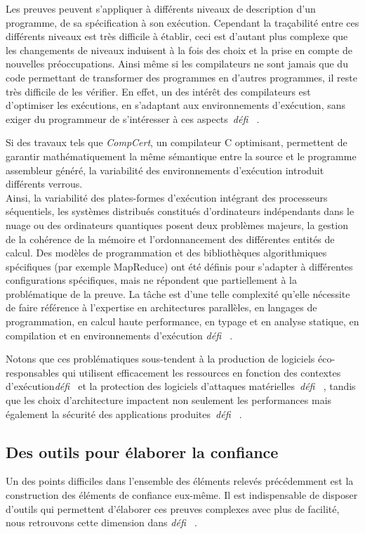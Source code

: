\documentclass[11pt]{article}
\newcommand{\defi}[1]{\emph{défi~%
\cite{#1}}}
\begin{document}
Les preuves peuvent s'appliquer à différents niveaux de description d'un programme, de sa spécification à son exécution. Cependant la traçabilité entre ces différents niveaux est très difficile à établir, ceci est d'autant plus complexe que les changements de niveaux induisent à la fois des choix et la prise en compte de nouvelles préoccupations.
Ainsi même si les compilateurs ne sont jamais que du code permettant de transformer des programmes en d'autres programmes, il reste très difficile de les vérifier. En effet, un des intérêt des compilateurs est d'optimiser les exécutions, en s'adaptant aux environnements d'exécution, sans exiger du programmeur de s'intéresser à ces aspects~\defi{Monniaux}.

Si des travaux tels que \textit{CompCert}, un compilateur C optimisant, permettent de garantir mathématiquement la même sémantique entre la source et le programme assembleur généré, la variabilité des environnements d'exécution introduit différents verrous. \\
Ainsi, la variabilité des  plates-formes d'exécution intégrant des processeurs séquentiels, les systèmes distribués constitués d'ordinateurs indépendants dans le nuage ou des ordinateurs quantiques posent  deux problèmes majeurs, la gestion de la cohérence de la mémoire et l'ordonnancement des différentes entités de calcul. Des modèles de programmation et des bibliothèques algorithmiques spécifiques (par exemple MapReduce) ont été définis pour s'adapter à différentes configurations spécifiques, mais ne répondent que partiellement à la problématique de la preuve. La tâche est d'une telle complexité qu'elle nécessite de faire référence à l'expertise en architectures parallèles, en langages de programmation, en calcul haute performance, en typage et en analyse statique, en compilation et en environnements d'exécution \defi{compilation}.

Notons que ces problématiques sous-tendent à la production de logiciels éco-responsables qui utilisent efficacement les ressources en fonction des contextes d'exécution\defi{vert} et la protection des logiciels d'attaques matérielles~\defi{Monniaux}, tandis que les choix d'architecture impactent non seulement les performances mais également la sécurité des applications produites~\defi{securite}.




\subsection{Des outils pour élaborer la confiance \label{ss:fiabilite:confiance}}
Un des points difficiles dans l'ensemble des éléments relevés précédemment est la construction des éléments de confiance eux-même. Il est indispensable de disposer d'outils qui permettent d'élaborer ces preuves complexes avec plus de facilité, nous retrouvons cette dimension dans \defi{Monniaux, reconfiguration}.  
\end{document}
